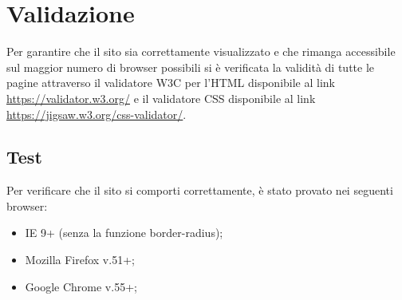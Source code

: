 \section{Validazione}
Per garantire che il sito sia correttamente visualizzato e che rimanga accessibile sul maggior numero di browser possibili si è verificata la validità di tutte le pagine attraverso il validatore W3C per l'HTML disponibile al link \url{https://validator.w3.org/} e il validatore CSS disponibile al link \url{https://jigsaw.w3.org/css-validator/}.

\subsection{Test} Per verificare che il sito si comporti correttamente, è stato provato nei seguenti browser: 
\begin{itemize} 	
	\item IE 9+ (senza la funzione border-radius); 	
	\item Mozilla Firefox v.51+; 	
	\item Google Chrome v.55+; 
\end{itemize} 

\newpage